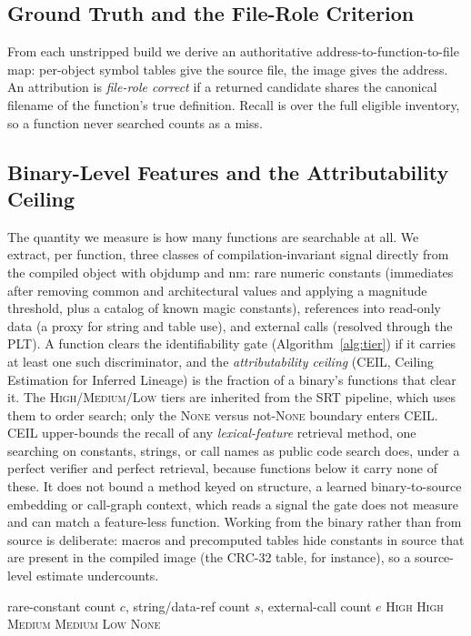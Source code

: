 \documentclass[conference]{IEEEtran}
\begin{document}
\subsection{Ground Truth and the File-Role Criterion}
From each unstripped build we derive an authoritative address-to-function-to-file
map: per-object symbol tables give the source file, the image gives the address.
An attribution is \emph{file-role correct} if a returned candidate shares the
canonical filename of the function's true definition. Recall is over the full
eligible inventory, so a function never searched counts as a miss.

\subsection{Binary-Level Features and the Attributability Ceiling}
The quantity we measure is how many functions are searchable at all. We extract,
per function, three classes of compilation-invariant signal directly from the
compiled object with objdump and nm: rare numeric constants (immediates after
removing common and architectural values and applying a magnitude threshold,
plus a catalog of known magic constants), references into read-only data
(a proxy for string and table use), and external calls (resolved through the
PLT). A function clears the identifiability gate (Algorithm~\ref{alg:tier}) if it
carries at least one such discriminator, and the \emph{attributability ceiling}
(CEIL, Ceiling Estimation for Inferred Lineage) is the fraction of a binary's functions
that clear it. The \textsc{High}/\textsc{Medium}/\textsc{Low} tiers are inherited
from the SRT pipeline, which uses them to order search; only the \textsc{None}
versus not-\textsc{None} boundary enters CEIL. CEIL upper-bounds the recall of any
\emph{lexical-feature} retrieval method, one searching on constants, strings, or
call names as public code search does, under a perfect verifier and perfect retrieval,
because functions below it carry none of these. It does not bound a method keyed on
structure, a learned binary-to-source embedding or
call-graph context, which reads a signal the gate does not measure and can match a
feature-less function. Working from the
binary rather than from source is deliberate: macros and precomputed tables hide
constants in source that are present in the compiled image (the CRC-32 table, for
instance), so a source-level estimate undercounts.

\begin{algorithm}[t]
\caption{Identifiability gate (a function is searchable if not \textsc{None})}
\label{alg:tier}
\begin{algorithmic}[1]
\Require rare-constant count $c$, string/data-ref count $s$, external-call count $e$
 \Return \textsc{High}
 \Return \textsc{High}
 \Return \textsc{Medium}
 \Return \textsc{Medium}
 \Return \textsc{Low}
\Else{} \Return \textsc{None}
\EndIf
\end{algorithmic}
\end{algorithm}
\end{document}
